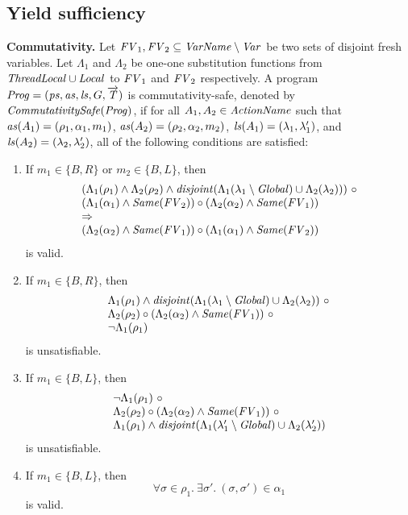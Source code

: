 \subsection{Yield sufficiency}

{\bf Commutativity.}
Let $\mathit{FV}_1,\mathit{FV}_2 \subseteq \mathit{VarName} \setminus \mathit{Var}$ be two sets of disjoint fresh variables.
Let $\Lambda_1$ and $\Lambda_2$ be one-one 
substitution functions from $\mathit{ThreadLocal} \cup \mathit{Local}$ to $\mathit{FV}_1$ and $\mathit{FV}_2$ respectively.
A program $\mathit{Prog} = (\mathit{ps}, \mathit{as}, \mathit{ls}, G, \overrightarrow{\mathit{T}})$ is commutativity-safe, denoted by $\mathit{CommutativitySafe}(\mathit{Prog})$,
if for all $A_1,A_2 \in \mathit{ActionName}$ such that $\mathit{as}(A_1) = (\rho_1,\alpha_1,m_1)$, $\mathit{as}(A_2) = (\rho_2,\alpha_2,m_2)$,
$\mathit{ls}(A_1) = (\lambda_1,\lambda'_1)$, and $\mathit{ls}(A_2) = (\lambda_2,\lambda'_2)$, 
all of the following conditions are satisfied:
\begin{enumerate}
\item
If $m_1 \in \{B,R\}$ or $m_2 \in \{B,L\}$, then 
\[
\begin{array}{l}
(\Lambda_1(\rho_1) \wedge \Lambda_2(\rho_2) \wedge \mathit{disjoint}(\Lambda_1(\lambda_1 \setminus \mathit{Global}) \cup \Lambda_2(\lambda_2)))\ \circ \\
(\Lambda_1(\alpha_1) \wedge \mathit{Same}(\mathit{FV}_2)) \circ (\Lambda_2(\alpha_2) \wedge \mathit{Same}(\mathit{FV}_1)) \\ 
\Rightarrow \\
(\Lambda_2(\alpha_2) \wedge \mathit{Same}(\mathit{FV}_1)) \circ (\Lambda_1(\alpha_1) \wedge \mathit{Same}(\mathit{FV}_2))
\end{array}
\]
is valid.
\item
If $m_1 \in \{B,R\}$, then 
\[
\begin{array}{l}
\Lambda_1(\rho_1) \wedge \mathit{disjoint}(\Lambda_1(\lambda_1 \setminus \mathit{Global}) \cup \Lambda_2(\lambda_2))\ \circ \\
\Lambda_2(\rho_2) \circ (\Lambda_2(\alpha_2) \wedge \mathit{Same}(\mathit{FV}_1))\ \circ \\
\neg \Lambda_1(\rho_1)
\end{array}
\]
is unsatisfiable.
\item
If $m_1 \in \{B,L\}$, then 
\[
\begin{array}{l}
\neg \Lambda_1(\rho_1)\ \circ \\
\Lambda_2(\rho_2) \circ (\Lambda_2(\alpha_2) \wedge \mathit{Same}(\mathit{FV}_1))\ \circ \\
\Lambda_1(\rho_1) \wedge \mathit{disjoint}(\Lambda_1(\lambda'_1 \setminus \mathit{Global}) \cup \Lambda_2(\lambda'_2))
\end{array}
\]
is unsatisfiable.
\item
If $m_1 \in \{B, L\}$, then
\[
\forall \sigma \in \rho_1.\ \exists \sigma'.\ (\sigma, \sigma') \in \alpha_1
\]
is valid.
\end{enumerate}

